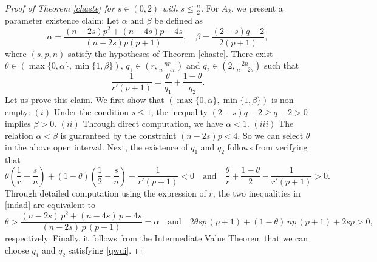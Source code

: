 \documentclass[preprint,compress,12pt]{elsarticle}
\numberwithin{equation}{section}
\begin{document}
\begin{proof}[Proof of Theorem \ref{chaste} for $s\in(0,2)$ with $s\leq \frac{n}{2}$]
	For $A_{2}$, we present a parameter existence claim: Let $\alpha$ and $\beta$ be defined as
	\begin{equation}\label{qwu}
		\alpha=\frac{(n-2s)p^{2}+(n-4s)p-4s}{(n-2s)p(p+1)}, \quad \beta=\frac{(2-s)q-2}{2(p+1)},
	\end{equation}
	where $(s, p, n)$ satisfy the hypotheses of Theorem \ref{chaste}.  There exist
	$\theta\in\left(\max\{0,\alpha\},\min\{1,\beta\}\right)$, $q_{1}\in \left(r,\frac{nr}{n-sr}\right)$ and $q_{2}\in \left(2,\frac{2n}{n-2s}\right)$ such that
	\begin{equation}\label{qwui}
		\frac{1}{r'(p+1)}=\frac{\theta}{q_{1}}+\frac{1-\theta}{q_{2}}.
	\end{equation}
	Let us prove this claim. We first show that $\left(\max\{0,\alpha\},\min\{1,\beta\}\right)$ is non-empty: $(i)$ Under the condition $s\leq 1$, the inequality $(2-s)q-2\geq q-2>0$ implies $\beta>0$.
	$(ii)$ Through direct computation, we have $\alpha<1$.
	$(iii)$ The relation $\alpha<\beta$ is guaranteed by the constraint $(n-2s)p<4$. So we can select $\theta$ in the above open interval. Next, the existence of  $q_{1}$ and $q_{2}$ follows from verifying that
	\begin{equation}\label{indad} \theta\left(\frac{1}{r}-\frac{s}{n}\right)+(1-\theta)\left(\frac{1}{2}-\frac{s}{n}\right)-\frac{1}{r'(p+1)}<0\quad \text{and} \quad \frac{\theta}{r}+\frac{1-\theta}{2}-\frac{1}{r'(p+1)}>0.
	\end{equation}
	Through detailed computation using the expression of $r$, the two inequalities in \eqref{indad} are equivalent to
	\begin{equation*}
		\theta> \frac{(n-2s)\,p^{2}+(n-4s)\, p-4s}{(n-2s)\, p\,(p+1)}=\alpha\quad \text{and} \quad 2\theta sp\,(p+1)+(1-\theta)\,np\,(p+1)+2sp>0,
	\end{equation*}
	respectively. Finally, it follows from the Intermediate Value Theorem that we can choose $q_{1}$ and $q_{2}$ satisfying \eqref{qwui}.
	

\end{proof}
\end{document}

